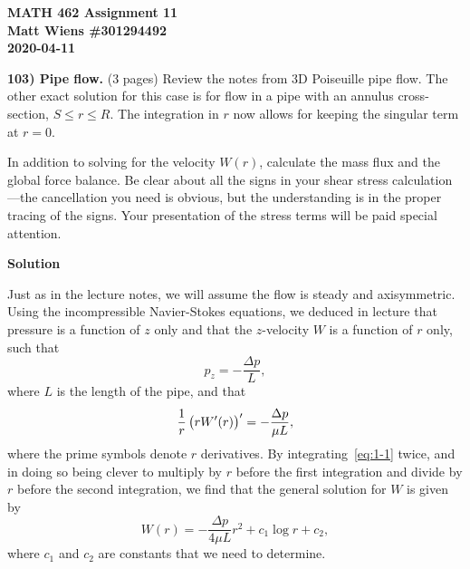 \documentclass{article}
\begin{document}
\textbf{MATH 462 Assignment 11} \\
\textbf{Matt Wiens \#301294492} \\
\textbf{2020-04-11}

\textbf{103) Pipe flow.} (3 pages)
Review the notes from 3D Poiseuille pipe flow. The other exact solution
for this case is for flow in a pipe with an annulus cross-section, $S
\leq r \leq R$. The integration in $r$ now allows for keeping the singular term
at $r = 0$.

In addition to solving for the velocity $W(r)$, calculate the mass flux
and the global force balance. Be clear about all the signs in your shear
stress calculation---the cancellation you need is obvious, but the
understanding is in the proper tracing of the signs. Your presentation
of the stress terms will be paid special attention.

\textbf{Solution}

Just as in the lecture notes, we will assume the flow is steady and
axisymmetric. Using the incompressible Navier-Stokes equations, we
deduced in lecture that pressure is a function of $z$ only and that the
$z$-velocity $W$ is a function of $r$ only, such that
%
\begin{equation*}
    p_z = - \frac{\Delta p}{L}
    ,
\end{equation*}
%
where $L$ is the length of the pipe, and that
%
\begin{equation}
    \frac{1}{r} \del{r W^\prime(r)}^\prime = - \frac{\Delta p}{\mu L}
    \label{eq:1-1}
    ,
\end{equation}
%
where the prime symbols denote $r$ derivatives. By integrating~\eqref{eq:1-1}
twice, and in doing so being clever to multiply by $r$ before the
first integration and divide by $r$ before the second integration, we
find that the general solution for $W$ is given by
%
\begin{equation*}
    W(r) = - \frac{\Delta p}{4 \mu L} r^2 + c_1 \log r + c_2
    ,
\end{equation*}
%
where $c_1$ and $c_2$ are constants that we need to determine.
\end{document}
